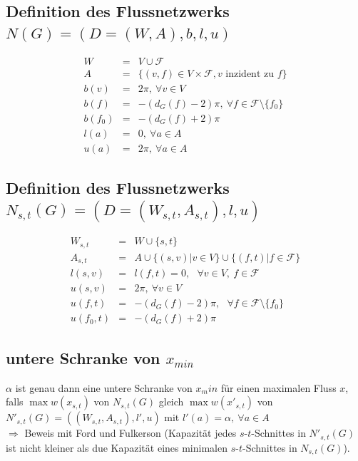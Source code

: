 \subsection{Definition des Flussnetzwerks $N(G)=(D=(W,A),b,l,u)$}
\vspace*{-\baselineskip}
\begin{eqnarray*}
	W&=&V\cup \mathcal{F}\\
	A&=&\{(v,f)\in V\times \mathcal{F}, v\text{ inzident zu }f\}\\
	b(v)&=&2\pi,~\forall v\in V\\
	b(f)&=&-(d_G(f)-2)\pi,~\forall f\in\mathcal{F}\setminus\{f_0\}\\
	b(f_0)&=&-(d_G(f)+2)\pi\\
	l(a)&=&0,~\forall a\in A\\
	u(a)&=&2\pi,~\forall a\in A
\end{eqnarray*}
\subsection{Definition des Flussnetzwerks $N_{s,t}(G)=(D=(W_{s,t},A_{s,t}),l,u)$}
\vspace*{-\baselineskip}
\begin{eqnarray*}
	W_{s,t}&=&W\cup \{s,t\}\\
	A_{s,t}&=&A\cup \{(s,v)|v\in V\}\cup \{(f,t)|f\in \mathcal{F}\}\\
	l(s,v)&=&l(f,t)=0,~~~\forall v\in V,~f\in\mathcal{F}\\
	u(s,v)&=&2\pi,~\forall v\in V\\
	u(f,t)&=&-(d_G(f)-2)\pi,~~~\forall f\in\mathcal{F}\setminus\{f_0\}\\
	u(f_0,t)&=&-(d_G(f)+2)\pi
\end{eqnarray*}
\subsection{untere Schranke von $x_{min}$}
\vspace*{-0.5\baselineskip}
$\alpha$ ist genau dann eine untere Schranke von $x_min$ für einen maximalen Fluss $x$, falls $\max w(x_{s,t})$ von $N_{s,t}(G)$ gleich $\max w(x'_{s,t})$ von $N'_{s,t}(G) = ((W_{s,t},A_{s,t}),l',u)$ mit $l'(a)=\alpha,~\forall a\in A$\\
$\Rightarrow$ Beweis mit Ford und Fulkerson (Kapazität jedes $s$-$t$-Schnittes in $N'_{s,t}(G)$ ist nicht kleiner als due Kapazität eines minimalen $s$-$t$-Schnittes in $N_{s,t}(G)$).

